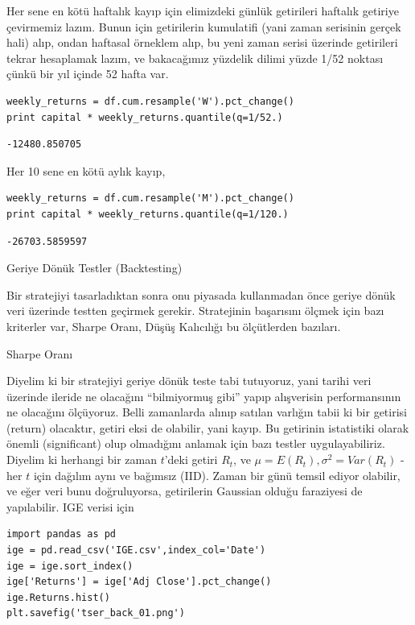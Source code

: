 \documentclass[12pt,fleqn]{article}\usepackage{../../common}
\begin{document}
Her sene en kötü haftalık kayıp için elimizdeki günlük getirileri haftalık
getiriye çevirmemiz lazım. Bunun için getirilerin kumulatifi (yani zaman
serisinin gerçek hali) alıp, ondan haftasal örneklem alıp, bu yeni zaman serisi
üzerinde getirileri tekrar hesaplamak lazım, ve bakacağımız yüzdelik dilimi
yüzde 1/52 noktası çünkü bir yıl içinde 52 hafta var.

\begin{verbatim}
weekly_returns = df.cum.resample('W').pct_change()
print capital * weekly_returns.quantile(q=1/52.)
\end{verbatim}

\begin{verbatim}
-12480.850705
\end{verbatim}

Her 10 sene en kötü aylık kayıp,

\begin{verbatim}
weekly_returns = df.cum.resample('M').pct_change()
print capital * weekly_returns.quantile(q=1/120.)
\end{verbatim}

\begin{verbatim}
-26703.5859597
\end{verbatim}

Geriye Dönük Testler (Backtesting)

Bir stratejiyi tasarladıktan sonra onu piyasada kullanmadan önce geriye dönük
veri üzerinde testten geçirmek gerekir. Stratejinin başarısını ölçmek için bazı
kriterler var, Sharpe Oranı, Düşüş Kalıcılığı bu ölçütlerden bazıları. 

Sharpe Oranı 

Diyelim ki bir stratejiyi geriye dönük teste tabi tutuyoruz, yani tarihi veri
üzerinde ileride ne olacağını ``bilmiyormuş gibi'' yapıp alışverisin
performansının ne olacağını ölçüyoruz. Belli zamanlarda alınıp satılan varlığın
tabii ki bir getirisi (return) olacaktır, getiri eksi de olabilir, yani
kayıp. Bu getirinin istatistiki olarak önemli (significant) olup olmadığını
anlamak için bazı testler uygulayabiliriz. Diyelim ki herhangi bir zaman
$t$'deki getiri $R_t$, ve $\mu = E(R_t), \sigma^2=Var(R_t)$ - her $t$ için
dağılım aynı ve bağımsız (IID). Zaman bir günü temsil ediyor olabilir, ve eğer
veri bunu doğruluyorsa, getirilerin Gaussian olduğu faraziyesi de
yapılabilir. IGE verisi için

\begin{verbatim}
import pandas as pd
ige = pd.read_csv('IGE.csv',index_col='Date')
ige = ige.sort_index()
ige['Returns'] = ige['Adj Close'].pct_change()
ige.Returns.hist()
plt.savefig('tser_back_01.png')
\end{verbatim}
\end{document}
